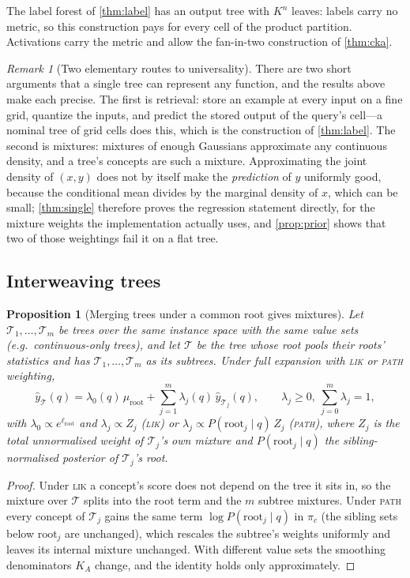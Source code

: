 \documentclass[11pt]{article}
\newtheorem{proposition}[theorem]{Proposition}
\theoremstyle{definition}
\theoremstyle{remark}
\newtheorem{remark}[theorem]{Remark}
\newcommand{\T}{\mathcal{T}}
\newcommand{\hy}{\hat{y}}
\begin{document}
The label forest of \cref{thm:label} has an output tree with $K^n$ leaves: labels carry
no metric, so this construction pays for every cell of the product partition.
Activations carry the metric and allow the fan-in-two construction of \cref{thm:cka}.

\begin{remark}[Two elementary routes to universality]\label{rem:routes}
There are two short arguments that a single tree can represent any function, and the
results above make each precise.  The first is retrieval: store an example at every
input on a fine grid, quantize the inputs, and predict the stored output of the query's
cell---a nominal tree of grid cells does this, which is the construction of
\cref{thm:label}.  The second is mixtures: mixtures of enough Gaussians approximate any
continuous density, and a tree's concepts are such a mixture.  Approximating the joint
density of $(x,y)$ does not by itself make the \emph{prediction} of $y$ uniformly good,
because the conditional mean divides by the marginal density of $x$, which can be small;
\cref{thm:single} therefore proves the regression statement directly, for the mixture
weights the implementation actually uses, and \cref{prop:prior} shows that two of those
weightings fail it on a flat tree.
\end{remark}

\subsection{Interweaving trees}

\begin{proposition}[Merging trees under a common root gives mixtures]\label{prop:interweave}
Let $\T_1,\dots,\T_m$ be trees over the same instance space with the same value sets
(e.g.\ continuous-only trees), and let $\T$ be the tree whose root pools their roots'
statistics and has $\T_1,\dots,\T_m$ as its subtrees.  Under full expansion with
\textsc{lik} or \textsc{path} weighting,
\[
  \hy_\T(q)=\lambda_0(q)\,\mu_{\text{root}}+\sum_{j=1}^m\lambda_j(q)\,\hy_{\T_j}(q),
  \qquad\lambda_j\ge0,\ \sum_{j=0}^m\lambda_j=1,
\]
with $\lambda_0\propto e^{\ell_{\text{root}}}$ and $\lambda_j\propto Z_j$ (\textsc{lik})
or $\lambda_j\propto P(\text{root}_j\mid q)\,Z_j$ (\textsc{path}), where $Z_j$ is the
total unnormalised weight of $\T_j$'s own mixture and $P(\text{root}_j\mid q)$ the
sibling-normalised posterior of $\T_j$'s root.
\end{proposition}
\begin{proof}
Under \textsc{lik} a concept's score does not depend on the tree it sits in, so the
mixture over $\T$ splits into the root term and the $m$ subtree mixtures.  Under
\textsc{path} every concept of $\T_j$ gains the same term $\log P(\text{root}_j\mid q)$
in $\pi_c$ (the sibling sets below $\text{root}_j$ are unchanged), which rescales the
subtree's weights uniformly and leaves its internal mixture unchanged.  With different
value sets the smoothing denominators $K_A$ change, and the identity holds only
approximately.
\end{proof}
\end{document}
